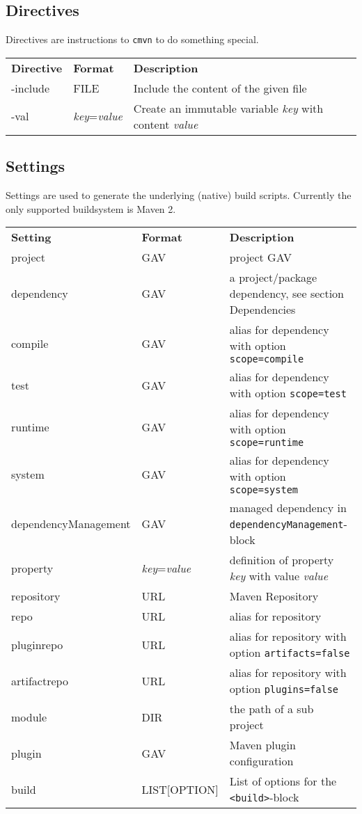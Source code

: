 \documentclass[a4paper,11pt,english,oneside,halfparskip]{scrartcl}
\newcommand{\cmvn}{\texttt{cmvn}}
\newcommand{\code}[1]{\texttt{#1}}
\begin{document}
\subsection{Directives}

Directives are instructions to \cmvn{} to do something special.

\begin{tabular}{lll}
\textbf{Directive} & \textbf{Format} & \textbf{Description} \\
-include & FILE & Include the content of the given file \\
-val & \emph{key}=\emph{value} & Create an immutable variable \emph{key} with content \emph{value} 
\end{tabular}


\subsection{Settings}

Settings are used to generate the underlying (native) build scripts. Currently the only supported buildsystem is Maven 2.

\begin{tabular}{lll}
\textbf{Setting} & \textbf{Format} & \textbf{Description} \\
project & GAV & project GAV \\
dependency & GAV & a project/package dependency, see section Dependencies \\
compile & GAV & alias for dependency with option \code{scope=compile} \\
test & GAV & alias for dependency with option \code{scope=test} \\
runtime & GAV & alias for dependency with option \code{scope=runtime} \\
system & GAV & alias for dependency with option \code{scope=system} \\
dependencyManagement & GAV & managed dependency in \code{dependencyManagement}-block \\
property & \emph{key}=\emph{value} & definition of property \emph{key} with value \emph{value} \\
repository & URL & Maven Repository \\
repo & URL & alias for repository \\
pluginrepo & URL & alias for repository with option \code{artifacts=false} \\
artifactrepo & URL & alias for repository with option \code{plugins=false} \\
module & DIR & the path of a sub project \\
plugin & GAV & Maven plugin configuration \\
build & LIST[OPTION] & List of options for the \code{<build>}-block
\end{tabular}
\end{document}
